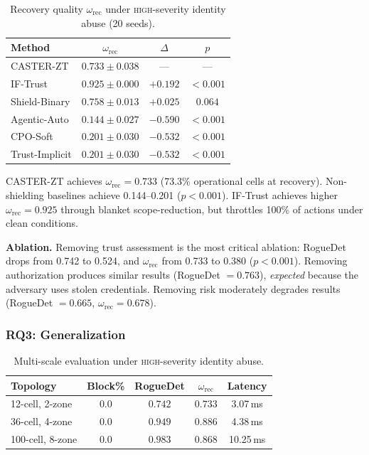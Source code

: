 \documentclass[lettersize,journal]{IEEEtran}
\begin{document}
\begin{table}[t]
\centering
\caption{Recovery quality $\omega_{\mathrm{rec}}$ under \textsc{high}-severity identity abuse (20 seeds).}
\label{tab:recovery_quality}
\begin{tabular}{lccc}
\toprule
Method & $\omega_{\mathrm{rec}}$ & $\Delta$ & $p$ \\
\midrule
CASTER-ZT & $\mathbf{0.733\pm0.038}$ & --- & --- \\
IF-Trust & $0.925\pm0.000$ & $+0.192$ & ${<}0.001$ \\
Shield-Binary & $0.758\pm0.013$ & $+0.025$ & $0.064$ \\
Agentic-Auto & $0.144\pm0.027$ & $-0.590$ & ${<}0.001$ \\
CPO-Soft & $0.201\pm0.030$ & $-0.532$ & ${<}0.001$ \\
Trust-Implicit & $0.201\pm0.030$ & $-0.532$ & ${<}0.001$ \\
\bottomrule
\end{tabular}
\end{table}

CASTER-ZT achieves $\omega_{\mathrm{rec}}=0.733$ (73.3\% operational cells at recovery).
Non-shielding baselines achieve 0.144--0.201 ($p<0.001$).
IF-Trust achieves higher $\omega_{\mathrm{rec}}=0.925$ through blanket scope-reduction, but throttles 100\% of actions under clean conditions.

\noindent\textbf{Ablation.}
Removing trust assessment is the most critical ablation: RogueDet drops from 0.742 to 0.524, and $\omega_{\mathrm{rec}}$ from 0.733 to 0.380 ($p<0.001$).
Removing authorization produces similar results (RogueDet $=0.763$), \emph{expected} because the adversary uses stolen credentials.
Removing risk moderately degrades results (RogueDet $=0.665$, $\omega_{\mathrm{rec}}=0.678$).


\subsubsection{RQ3: Generalization}

\begin{table}[t]
\centering
\caption{Multi-scale evaluation under \textsc{high}-severity identity abuse.}
\label{tab:multiscale}
\begin{tabular}{lcccc}
\toprule
Topology & Block\% & RogueDet & $\omega_{\mathrm{rec}}$ & Latency \\
\midrule
12-cell, 2-zone & $0.0$ & $0.742$ & $0.733$ & 3.07\,ms \\
36-cell, 4-zone & $0.0$ & $0.949$ & $0.886$ & 4.38\,ms \\
100-cell, 8-zone & $0.0$ & $0.983$ & $0.868$ & 10.25\,ms \\
\bottomrule
\end{tabular}
\end{table}
\end{document}

